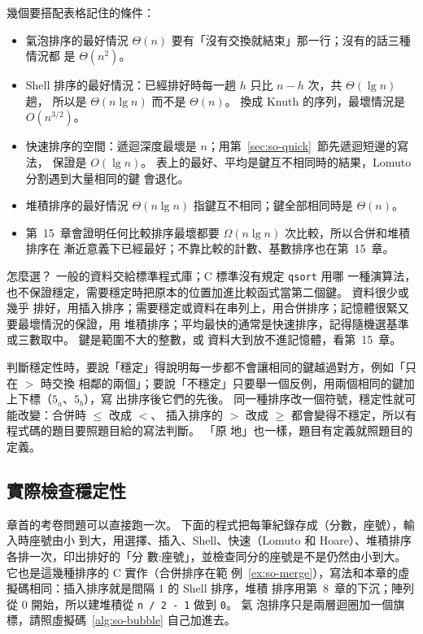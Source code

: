 幾個要搭配表格記住的條件：

\begin{itemize}
\item 氣泡排序的最好情況 $\Theta(n)$ 要有「沒有交換就結束」那一行；沒有的話三種情況都
是 $\Theta(n^2)$。
\item Shell 排序的最好情況：已經排好時每一趟 $h$ 只比 $n - h$ 次，共 $\Theta(\lg n)$ 趟，
所以是 $\Theta(n \lg n)$ 而不是 $\Theta(n)$。 換成 Knuth 的序列，最壞情況是
$O(n^{3/2})$。
\item 快速排序的空間：遞迴深度最壞是 $n$；用第~\ref{sec:so-quick}~節先遞迴短邊的寫法，
保證是 $O(\lg n)$。 表上的最好、平均是鍵互不相同時的結果，Lomuto 分割遇到大量相同的鍵
會退化。
\item 堆積排序的最好情況 $\Theta(n \lg n)$ 指鍵互不相同；鍵全部相同時是 $\Theta(n)$。
\item 第~15~章會證明任何比較排序最壞都要 $\Omega(n \lg n)$ 次比較，所以合併和堆積排序在
漸近意義下已經最好；不靠比較的計數、基數排序也在第~15~章。
\end{itemize}

怎麼選？ 一般的資料交給標準程式庫；C 標準沒有規定 \texttt{qsort} 用哪
一種演算法，也不保證穩定，需要穩定時把原本的位置加進比較函式當第二個鍵。 資料很少或幾乎
排好，用插入排序；需要穩定或資料在串列上，用合併排序；記憶體很緊又要最壞情況的保證，用
堆積排序；平均最快的通常是快速排序，記得隨機選基準或三數取中。 鍵是範圍不大的整數，或
資料大到放不進記憶體，看第~15~章。

\begin{examnote}
判斷穩定性時，要說「穩定」得說明每一步都不會讓相同的鍵越過對方，例如「只在 $>$ 時交換
相鄰的兩個」；要說「不穩定」只要舉一個反例，用兩個相同的鍵加上下標（$5_a$、$5_b$），寫
出排序後它們的先後。 同一種排序改一個符號，穩定性就可能改變：合併時 $\le$ 改成 $<$、
插入排序的 $>$ 改成 $\ge$ 都會變得不穩定，所以有程式碼的題目要照題目給的寫法判斷。 「原
地」也一樣，題目有定義就照題目的定義。
\end{examnote}

\subsection{實際檢查穩定性}

章首的考卷問題可以直接跑一次。 下面的程式把每筆紀錄存成（分數，座號），輸入時座號由小
到大，用選擇、插入、Shell、快速（Lomuto 和 Hoare）、堆積排序各排一次，印出排好的「分
數:座號」，並檢查同分的座號是不是仍然由小到大。 它也是這幾種排序的 C 實作（合併排序在範
例~\ref{ex:so-merge}），寫法和本章的虛擬碼相同：插入排序就是間隔 $1$ 的 Shell 排序，堆積
排序用第~8~章的下沉；陣列從 $0$ 開始，所以建堆積從 \texttt{n / 2 - 1} 做到 \texttt{0}。 氣
泡排序只是兩層迴圈加一個旗標，請照虛擬碼~\ref{alg:so-bubble} 自己加進去。

